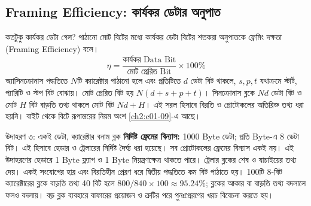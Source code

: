 \subsection{Framing Efficiency: কার্যকর ডেটার অনুপাত}
\label{ch2:c02-07}
\begin{keypointbox}{কতটুকু কার্যকর ডেটা গেল?}
পাঠানো মোট বিটের মধ্যে কার্যকর ডেটা বিটের শতকরা অনুপাতকে ফ্রেমিং দক্ষতা (Framing Efficiency) বলে।
\[
\eta=\frac{\text{কার্যকর Data Bit}}{\text{মোট প্রেরিত Bit}}\times100\%
\]
অ্যাসিনক্রোনাস পদ্ধতিতে $N$টি ক্যারেক্টার পাঠানো হলে এবং প্রতিটিতে $d$ ডেটা বিট থাকলে, $s,p,t$ যথাক্রমে স্টার্ট, প্যারিটি ও স্টপ বিট বোঝায়। মোট প্রেরিত বিট হয় $N(d+s+p+t)$। সিনক্রোনাস ব্লকে $Nd$ ডেটা বিট ও মোট $H$ বিট বাড়তি তথ্য থাকলে মোট বিট $Nd+H$। এই সরল হিসাবে বিরতি ও প্রোটোকলের অতিরিক্ত তথ্য ধরা হয়নি। বাইট থেকে বিটে রূপান্তরের নিয়ম অংশ \ref{ch2:c01-09}-এ আছে।
\end{keypointbox}
\begin{examplebox}{উদাহরণ ৩: একই ডেটা, ক্যারেক্টার বনাম ব্লক}
\textbf{নির্দিষ্ট ফ্রেমের বিন্যাস:} 1000 Byte ডেটা; প্রতি Byte-এ 8 ডেটা বিট। এই হিসাবে হেডার ও ট্রেলারের নির্দিষ্ট দৈর্ঘ্য ধরা হয়েছে। সব প্রোটোকলের ফ্রেমের বিন্যাস একই নয়।
এই উদাহরণের হেডারে 1 Byte ফ্ল্যাগ ও 1 Byte নিয়ন্ত্রণক্ষেত্র থাকতে পারে। ট্রেলার ব্লকের শেষ ও যাচাইয়ের তথ্য দেয়। একই সংযোগের হার এবং বিরতিহীন প্রেরণ ধরে দ্বিতীয় পদ্ধতিতে কম বিট পাঠাতে হয়। 100টি 8-বিট ক্যারেক্টারের ব্লকে বাড়তি তথ্য 40 বিট হলে $800/840\times100\approx95.24\%$; ব্লকের আকার বা বাড়তি তথ্য বদলালে ফলও বদলায়। বড় ব্লক ব্যবহারে বাফারের প্রয়োজন ও ত্রুটির পরে পুনঃপ্রেরণের খরচ বিবেচনা করতে হয়।
\end{examplebox}

